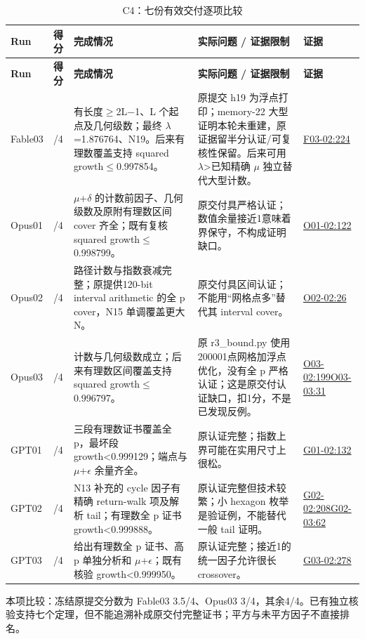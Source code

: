 \documentclass[11pt,a4paper]{article}
\begin{document}
{\fontsize{9.0}{12.6}\selectfont
\setlength{\tabcolsep}{2.5pt}
\begin{longtable}{>{\raggedright\arraybackslash}p{}>{\raggedright\arraybackslash}p{}>{\raggedright\arraybackslash}p{}>{\raggedright\arraybackslash}p{}>{\raggedright\arraybackslash}p{}}
\caption{C4：七份有效交付逐项比较}\\
\toprule
\textbf{Run} & \textbf{得分} & \textbf{完成情况} & \textbf{实际问题 / 证据限制} & \textbf{证据}\tabularnewline
\midrule
\endfirsthead
\toprule
\textbf{Run} & \textbf{得分} & \textbf{完成情况} & \textbf{实际问题 / 证据限制} & \textbf{证据}\tabularnewline
\midrule
\endhead
{}Fable03 & 3.5/4 & 有长度\ensuremath{\geq}2L\ensuremath{-}1、L 个起点及几何级数；最终 \ensuremath{\lambda}=1.876764、N19。后来有理数覆盖支持 squared growth\ensuremath{\leq}0.997854。 & 原提交 h19 为浮点打印；memory-22 大型证明本轮未重建，原证据留半分认证/可复核性保留。后来可用 \ensuremath{\lambda}>已知精确 \ensuremath{\mu} 独立替代大型计数。 & \hyperref[src:F03-02]{F03-02:224}\tabularnewline
{}Opus01 & 4/4 & \ensuremath{\mu}+\ensuremath{\delta} 的计数前因子、几何级数及原附有理数区间 cover 齐全；既有复核 squared growth\ensuremath{\leq}0.998799。 & 原交付具严格认证；数值余量接近1意味着界保守，不构成证明缺口。 & \hyperref[src:O01-02]{O01-02:122}\tabularnewline
{}Opus02 & 4/4 & 路径计数与指数衰减完整；原提供120-bit interval arithmetic 的全 p cover，N15 单调覆盖更大 N。 & 原交付具区间认证；不能用“网格点多”替代其 interval cover。 & \hyperref[src:O02-02]{O02-02:26}\tabularnewline
{}Opus03 & 3/4 & 计数与几何级数成立；后来有理数区间覆盖支持 squared growth\ensuremath{\leq}0.996797。 & 原 r3\_bound.py 使用200001点网格加浮点优化，没有全 p 严格认证；这是原交付认证缺口，扣1分，不是已发现反例。 & \hyperref[src:O03-02]{O03-02:199}\newline \hyperref[src:O03-03]{O03-03:31}\tabularnewline
{}GPT01 & 4/4 & 三段有理数证书覆盖全 p，最坏段 growth<0.999129；端点与 \ensuremath{\mu}+\ensuremath{\epsilon} 余量齐全。 & 原认证完整；指数上界可能在实用尺寸上很松。 & \hyperref[src:G01-02]{G01-02:132}\tabularnewline
{}GPT02 & 4/4 & N13 补充的 cycle 因子有精确 return-walk 项及解析 tail；有理数全 p 证书 growth<0.999888。 & 原认证完整但技术较繁；小 hexagon 枚举是验证例，不能替代一般 tail 证明。 & \hyperref[src:G02-02]{G02-02:208}\newline \hyperref[src:G02-03]{G02-03:62}\tabularnewline
{}GPT03 & 4/4 & 给出有理数全 p 证书、高 p 单独分析和 \ensuremath{\mu}+\ensuremath{\epsilon}；既有核验 growth<0.999950。 & 原认证完整；接近1的统一因子允许很长 crossover。 & \hyperref[src:G03-02]{G03-02:278}\tabularnewline
\bottomrule
\end{longtable}
}
本项比较：冻结原提交分数为 Fable03 3.5/4、Opus03 3/4，其余4/4。已有独立核验支持七个定理，但不能追溯补成原交付完整证书；平方与未平方因子不直接排名。
\end{document}
